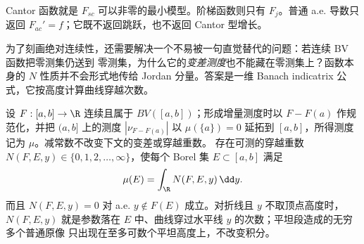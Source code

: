 Cantor 函数就是 $F_{sc}$ 可以非零的最小模型。阶梯函数则只有 $F_j$。普通 a.e. 导数只返回
$F_{ac}'=f$；它既不返回跳跃，也不返回 Cantor 型增长。

为了刻画绝对连续性，还需要解决一个不易被一句直觉替代的问题：若连续 BV 函数把零测集仍送到
零测集，为什么它的\emph{变差测度}也不能藏在零测集上？函数本身的 $N$ 性质并不会形式地传给
Jordan 分量。答案是一维 Banach indicatrix 公式，它按高度计算曲线穿越次数。

\begin{lemma}\label{lemma:4-2-3-banach-indicatrix}
设 $F:[a,b]\to\R$ 连续且属于 $BV([a,b])$；形成增量测度时以
$F-F(a)$ 作规范化，并把 $(a,b]$ 上的测度 $|\nu_{F-F(a)}|$ 以
$\mu(\{a\})=0$ 延拓到 $[a,b]$，所得测度记为 $\mu$。减常数不改变下文的变差或穿越重数。
存在可测的穿越重数
$N(F,E,y)\in\{0,1,2,\ldots,\infty\}$，使每个 Borel 集 $E\subset[a,b]$ 满足
\begin{equation}\label{eq:4-2-banach-indicatrix}
 \mu(E)=\int_\R N(F,E,y)\,\dd y.
\end{equation}
而且 $N(F,E,y)=0$ 对 a.e. $y\notin F(E)$ 成立。对折线且 $y$ 不取顶点高度时，
$N(F,E,y)$ 就是参数落在 $E$ 中、曲线穿过水平线 $y$ 的次数；平坦段造成的无穷多个普通原像
只出现在至多可数个平坦高度上，不改变积分。
\end{lemma}

